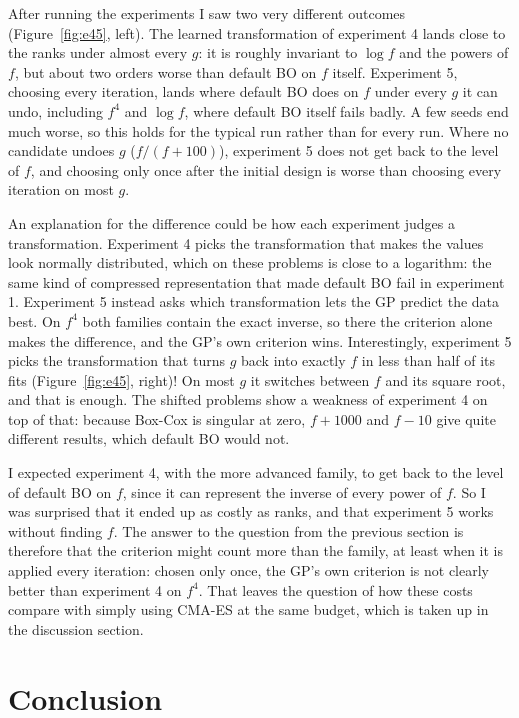 \documentclass[12pt,a4paper]{article}
\begin{document}
After running the experiments I saw two very different outcomes (Figure~\ref{fig:e45}, left). The learned transformation of experiment 4 lands close to the ranks under almost every \(g\): it is roughly invariant to \(\log f\) and the powers of \(f\), but about two orders worse than default BO on \(f\) itself. Experiment 5, choosing every iteration, lands where default BO does on \(f\) under every \(g\) it can undo, including \(f^{4}\) and \(\log f\), where default BO itself fails badly. A few seeds end much worse, so this holds for the typical run rather than for every run. Where no candidate undoes \(g\) (\(f/(f + 100)\)), experiment 5 does not get back to the level of \(f\), and choosing only once after the initial design is worse than choosing every iteration on most \(g\).

An explanation for the difference could be how each experiment judges a transformation. Experiment 4 picks the transformation that makes the values look normally distributed, which on these problems is close to a logarithm: the same kind of compressed representation that made default BO fail in experiment 1. Experiment 5 instead asks which transformation lets the GP predict the data best. On \(f^{4}\) both families contain the exact inverse, so there the criterion alone makes the difference, and the GP's own criterion wins. Interestingly, experiment 5 picks the transformation that turns \(g\) back into exactly \(f\) in less than half of its fits (Figure~\ref{fig:e45}, right)! On most \(g\) it switches between \(f\) and its square root, and that is enough. The shifted problems show a weakness of experiment 4 on top of that: because Box-Cox is singular at zero, \(f + 1000\) and \(f - 10\) give quite different results, which default BO would not.

I expected experiment 4, with the more advanced family, to get back to the level of default BO on \(f\), since it can represent the inverse of every power of \(f\). So I was surprised that it ended up as costly as ranks, and that experiment 5 works without finding \(f\). The answer to the question from the previous section is therefore that the criterion might count more than the family, at least when it is applied every iteration: chosen only once, the GP's own criterion is not clearly better than experiment 4 on \(f^{4}\). That leaves the question of how these costs compare with simply using CMA-ES at the same budget, which is taken up in the discussion section.

\section{Conclusion}
\end{document}
